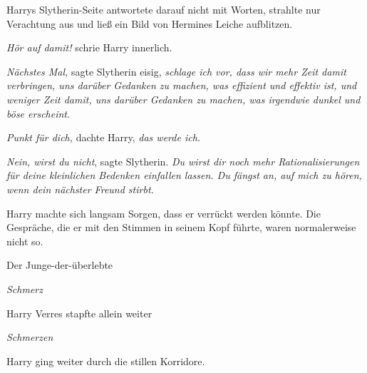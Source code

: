 Harrys Slytherin-Seite antwortete darauf nicht mit Worten, strahlte nur Verachtung aus und ließ ein Bild von Hermines Leiche aufblitzen.

\emph{Hör auf damit!} schrie Harry innerlich.

\emph{Nächstes Mal,} sagte Slytherin eisig, \emph{schlage ich vor, dass wir mehr Zeit damit verbringen, uns darüber Gedanken zu machen, was effizient und effektiv ist, und weniger Zeit damit, uns darüber Gedanken zu machen, was irgendwie dunkel und böse erscheint.}

\emph{Punkt für dich,} dachte Harry, \emph{das werde ich.}

\emph{Nein, wirst du nicht}, sagte Slytherin. \emph{Du wirst dir noch mehr Rationalisierungen für deine kleinlichen Bedenken einfallen lassen. Du fängst an, auf mich zu hören, wenn dein \emph{nächster} Freund stirbt.}

Harry machte sich langsam Sorgen, dass er verrückt werden könnte. Die Gespräche, die er mit den Stimmen in seinem Kopf führte, waren normalerweise nicht so.

Der Junge-der-überlebte

\emph{Schmerz}

Harry Verres stapfte allein weiter

\emph{Schmerzen}

Harry ging weiter durch die stillen Korridore.

\later


